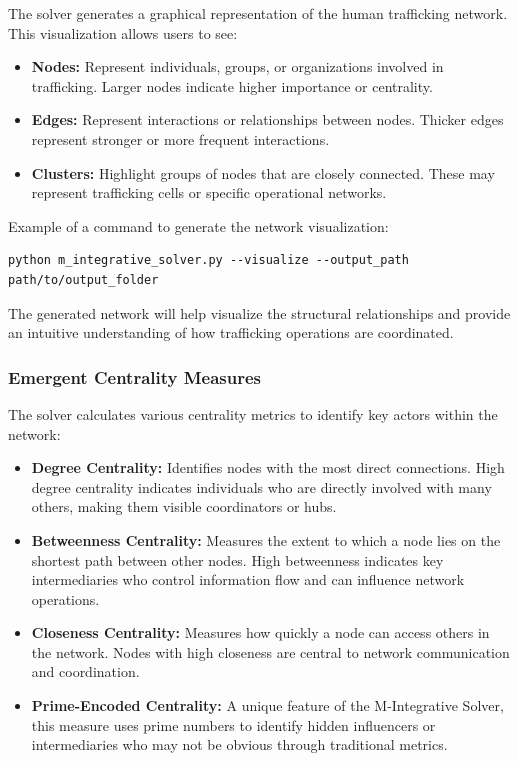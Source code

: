 \documentclass[%
 preprint, linenumbers,
 amsmath,amssymb,
 aps, physrev,
]{revtex4-2}
\begin{document}
The solver generates a graphical representation of the human trafficking network. This visualization allows users to see:
\begin{itemize}
    \item \textbf{Nodes:} Represent individuals, groups, or organizations involved in trafficking. Larger nodes indicate higher importance or centrality.
    \item \textbf{Edges:} Represent interactions or relationships between nodes. Thicker edges represent stronger or more frequent interactions.
    \item \textbf{Clusters:} Highlight groups of nodes that are closely connected. These may represent trafficking cells or specific operational networks.
\end{itemize}

Example of a command to generate the network visualization:
\begin{verbatim}
python m_integrative_solver.py --visualize --output_path path/to/output_folder
\end{verbatim}

The generated network will help visualize the structural relationships and provide an intuitive understanding of how trafficking operations are coordinated.

\subsubsection{Emergent Centrality Measures}

The solver calculates various centrality metrics to identify key actors within the network:
\begin{itemize}
    \item \textbf{Degree Centrality:} Identifies nodes with the most direct connections. High degree centrality indicates individuals who are directly involved with many others, making them visible coordinators or hubs.
    \item \textbf{Betweenness Centrality:} Measures the extent to which a node lies on the shortest path between other nodes. High betweenness indicates key intermediaries who control information flow and can influence network operations.
    \item \textbf{Closeness Centrality:} Measures how quickly a node can access others in the network. Nodes with high closeness are central to network communication and coordination.
    \item \textbf{Prime-Encoded Centrality:} A unique feature of the M-Integrative Solver, this measure uses prime numbers to identify hidden influencers or intermediaries who may not be obvious through traditional metrics.
\end{itemize}
\end{document}
